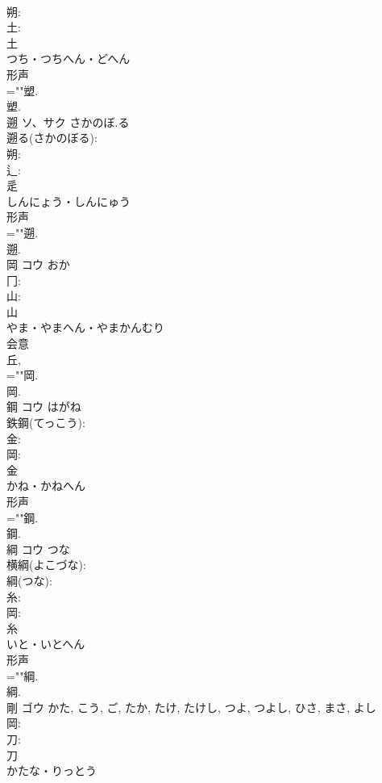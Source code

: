 \documentclass[8pt]{extreport}
\begin{document}
\begin{CJK}{UTF8}{min}
\\	朔: 
\\	土: 
\\	土	
\\	つち・つちへん・どへん	
\\	形声 
\\	=""塑.
\\	塑.
\\	遡	ソ、サク	さかのぼ.る		
\\	遡る(さかのぼる): 
\\	朔: 
\\	辶: 
\\	辵	
\\	しんにょう・しんにゅう	
\\	形声 
\\	=""遡.
\\	遡.
\\	岡	コウ	おか		
\\	冂: 
\\	山: 
\\	山	
\\	やま・やまへん・やまかんむり	
\\	会意 
\\	丘, 
\\	=""岡.
\\	岡.
\\	鋼	コウ	はがね		
\\	鉄鋼(てっこう): 
\\	金: 
\\	岡: 
\\	金	
\\	かね・かねへん	
\\	形声 
\\	=""鋼.
\\	鋼.
\\	綱	コウ	つな		
\\	横綱(よこづな): 
\\	綱(つな): 
\\	糸: 
\\	岡: 
\\	糸	
\\	いと・いとへん	
\\	形声 
\\	=""綱.
\\	綱.
\\	剛	ゴウ		かた, こう, ご, たか, たけ, たけし, つよ, つよし, ひさ, まさ, よし	
\\	岡: 
\\	刀: 
\\	刀	
\\	かたな・りっとう	

\end{CJK}
\end{document}
